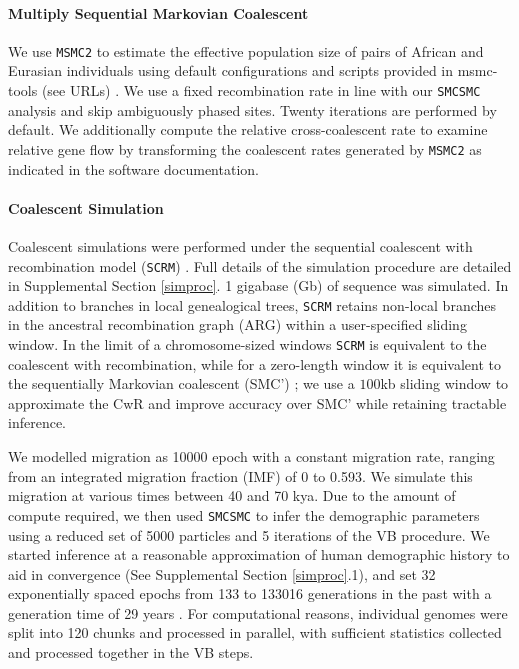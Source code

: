 \documentclass{article}
\begin{document}
\paragraph{Multiply Sequential Markovian Coalescent} We use {\tt MSMC2} to estimate the effective population size of pairs of African and Eurasian individuals using default configurations and scripts provided in msmc-tools (see URLs) \cite{Schiffels2014, Wang2019a}. We use a fixed recombination rate in line with our {\tt SMCSMC} analysis and skip ambiguously phased sites. Twenty iterations are performed by default. We additionally compute the relative cross-coalescent rate to examine relative gene flow by transforming the coalescent rates generated by {\tt MSMC2} as indicated in the software documentation.

\paragraph{Coalescent Simulation} Coalescent simulations were performed under the sequential coalescent with recombination model ({\tt SCRM}) \cite{Staab2015}. Full details of the simulation procedure are detailed in Supplemental Section \ref{simproc}. 1 gigabase (Gb) of sequence was simulated.  In addition to branches in local genealogical trees, {\tt SCRM} retains non-local branches in the ancestral recombination graph (ARG) within a user-specified sliding window.  In the limit of a chromosome-sized windows {\tt SCRM} is equivalent to the coalescent with recombination, while for a zero-length window it is equivalent to the sequentially Markovian coalescent (SMC') \cite{McVean2005,Marjoram2006}; we use a $100$kb sliding window to approximate the CwR and improve accuracy over SMC' while retaining tractable inference.

We modelled migration as 10000 epoch with a constant migration rate, ranging from an integrated migration fraction (IMF) of 0 to 0.593. We simulate this migration at various times between 40 and 70 kya.  Due to the amount of compute required, we then used {\tt SMCSMC} to infer the demographic parameters using a reduced set of 5000 particles and 5 iterations of the VB procedure. We started inference at a reasonable approximation of human demographic history to aid in convergence (See Supplemental Section \ref{simproc}.1), and set 32 exponentially spaced epochs from 133 to 133016 generations in the past with a generation time of 29 years \cite{Fenner2005}.  For computational reasons, individual genomes were split into 120 chunks and processed in parallel, with sufficient statistics collected and processed together in the VB steps.
\end{document}
